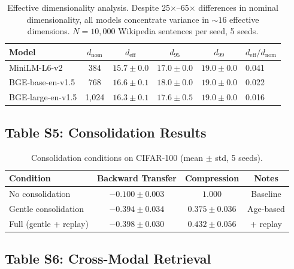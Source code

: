 \documentclass[11pt]{article}
\begin{document}
\begin{table}[!ht]
\centering
\caption{Effective dimensionality analysis. Despite 25$\times$--65$\times$ differences in nominal dimensionality, all models concentrate variance in ${\sim}16$ effective dimensions. $N = 10{,}000$ Wikipedia sentences per seed, 5 seeds.}
\label{tab:eff_dim}
\small
\begin{tabular}{@{}lccccl@{}}
\toprule
\textbf{Model} & $d_\text{nom}$ & $d_\text{eff}$ & $d_{95}$ & $d_{99}$ & $d_\text{eff}/d_\text{nom}$ \\
\midrule
MiniLM-L6-v2 & 384 & $15.7 \pm 0.0$ & $17.0 \pm 0.0$ & $19.0 \pm 0.0$ & 0.041 \\
BGE-base-en-v1.5 & 768 & $16.6 \pm 0.1$ & $18.0 \pm 0.0$ & $19.0 \pm 0.0$ & 0.022 \\
BGE-large-en-v1.5 & 1{,}024 & $16.3 \pm 0.1$ & $17.6 \pm 0.5$ & $19.0 \pm 0.0$ & 0.016 \\
\bottomrule
\end{tabular}
\end{table}

\subsection*{Table S5: Consolidation Results}

\begin{table}[!ht]
\centering
\caption{Consolidation conditions on CIFAR-100 (mean $\pm$ std, 5 seeds).}
\label{tab:phase3_full}
\small
\begin{tabular}{@{}lccc@{}}
\toprule
\textbf{Condition} & \textbf{Backward Transfer} & \textbf{Compression} & \textbf{Notes} \\
\midrule
No consolidation & $-0.100 \pm 0.003$ & $1.000$ & Baseline \\
Gentle consolidation & $-0.394 \pm 0.034$ & $0.375 \pm 0.036$ & Age-based \\
Full (gentle + replay) & $-0.398 \pm 0.030$ & $0.432 \pm 0.056$ & + replay \\
\bottomrule
\end{tabular}
\end{table}

\subsection*{Table S6: Cross-Modal Retrieval}
\end{document}
